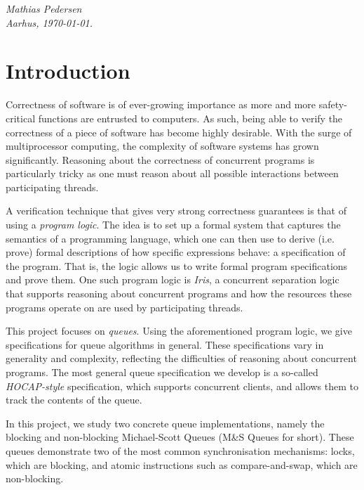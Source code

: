 \documentclass[a4paper, 10pt]{report}
\theoremstyle{definition}
\newcommand{\msq}{M\&S Queue}
\begin{document}
\vspace{2ex}
\begin{flushright}
  \emph{Mathias Pedersen}\\
  \emph{Aarhus, \today.}
\end{flushright}


\tableofcontents
\cleardoublepage
{}
\setcounter{secnumdepth}{2}


\chapter{Introduction}
\label{ch:intro}

Correctness of software is of ever-growing importance as more and more safety-critical functions are entrusted to computers. As such, being able to verify the correctness of a piece of software has become highly desirable. With the surge of multiprocessor computing, the complexity of software systems has grown significantly. Reasoning about the correctness of concurrent programs is particularly tricky as one must reason about all possible interactions between participating threads.

A verification technique that gives very strong correctness guarantees is that of using a \textit{program logic}. The idea is to set up a formal system that captures the semantics of a programming language, which one can then use to derive (i.e. prove) formal descriptions of how specific expressions behave: a specification of the program. That is, the logic allows us to write formal program specifications and prove them. One such program logic is \textit{Iris}, a concurrent separation logic that supports reasoning about concurrent programs and how the resources these programs operate on are used by participating threads.

This project focuses on \textit{queues}. Using the aforementioned program logic, we give specifications for queue algorithms in general. These specifications vary in generality and complexity, reflecting the difficulties of reasoning about concurrent programs. The most general queue specification we develop is a so-called \textit{HOCAP-style} specification, which supports concurrent clients, and allows them to track the contents of the queue.

In this project, we study two concrete queue implementations, namely the blocking and non-blocking Michael-Scott Queues (\msq{}s for short). These queues demonstrate two of the most common synchronisation mechanisms: locks, which are blocking, and atomic instructions such as compare-and-swap, which are non-blocking.
\end{document}
